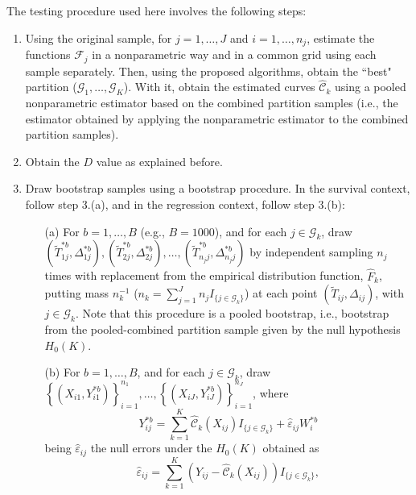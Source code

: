 The testing procedure used here involves the following steps:

\begin{enumerate}

\item Using the original sample, for $j = 1, \ldots, J$ and $i = 1, \ldots, n_j$, estimate the  functions $\mathcal{F}_j$ in a nonparametric way and in a common grid using each sample separately. Then, using the proposed algorithms, obtain the ``best" partition  ($\mathcal{G}_1,\ldots,\mathcal{G}_K$). With it, obtain the estimated curves $\widehat{\mathcal{C}}_k$  using a pooled nonparametric estimator based on the combined partition samples (i.e., the estimator obtained by applying the nonparametric estimator to the combined partition samples).



\item  Obtain the $D$ value as explained before.



\item Draw bootstrap samples using a bootstrap procedure. In the survival context, follow step 3.(a), and in the regression context,  follow step 3.(b):
\begin{itemize}
\item[(a)] For $b = 1, \ldots, B$ (e.g., $B = 1000$), and for each $j \in \mathcal{G}_k$, draw $(\widetilde T_{1j}^{\ast b}, \Delta_{1j}^{\ast b}), (\widetilde T_{2j}^{\ast b}, \Delta_{2j}^{\ast b}), \ldots, (\widetilde T_{n_{j} j}^{\ast b}, \Delta_{n_{j} j}^{\ast b})$  by independent sampling $n_j$ times with replacement from the empirical distribution function, $\widehat{F}_k$, putting mass $n_{k}^{-1}$ ($n_k = \sum_{j=1}^{J} n_{j} I_{\{j \in \mathcal{G}_k\}}$) at each point  $(\widetilde T_{ij}, \Delta_{ij})$, with $j \in \mathcal{G}_k$.  Note that this procedure is a  pooled bootstrap, i.e., bootstrap from the pooled-combined partition sample given by the null hypothesis $H_0({K})$.


\item[(b)] For $b = 1, \ldots ,B$, and for each $j \in \mathcal{G}_k$,  draw 
$\left\{ { \left( {X_{i1}, Y_{i1}^{\ast b}} \right)}\right\}_{i=1}^{n_1},\ldots,\left\{ { \left( {X_{iJ}, Y_{iJ}^{\ast b}} \right)}\right\}_{i=1}^{n_J}$,
where  
\[
Y_{ij}^{\ast b}=  \sum _{k=1}^K  \widehat{\mathcal{C}}_k(X_{ij}) I_{\{j \in \mathcal{G}_k\}}
    +\widehat \varepsilon_{ij} W_i^{\ast b}
\]
\noindent
being  $\widehat \varepsilon_{ij}$ the null errors under the $H_0(K)$ obtained as 
\[\widehat \varepsilon_{ij}=\sum _{k=1}^K  \left( {Y_{ij}- \widehat{\mathcal{C}}_k(X_{ij})}\right) I_{\{j \in \mathcal{G}_k\}},
\]



\end{itemize}
\end{enumerate}
